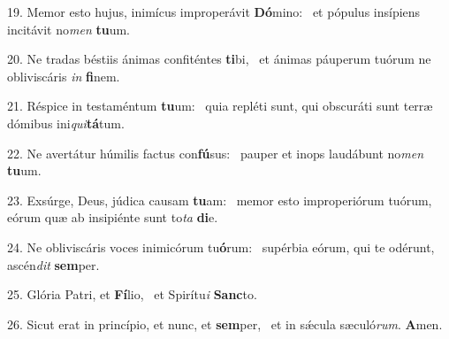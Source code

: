 19. Memor esto hujus, inimícus improperávit \textbf{Dó}mino: \ast\  et pópulus insípiens incitávit no\textit{men} \textbf{tu}um.\

20. Ne tradas béstiis ánimas confiténtes \textbf{ti}bi, \ast\  et ánimas páuperum tuórum ne obliviscáris \textit{in} \textbf{fi}nem.\

21. Réspice in testaméntum \textbf{tu}um: \ast\  quia repléti sunt, qui obscuráti sunt terræ dómibus ini\textit{qui}\textbf{tá}tum.\

22. Ne avertátur húmilis factus con\textbf{fú}sus: \ast\  pauper et inops laudábunt no\textit{men} \textbf{tu}um.\

23. Exsúrge, Deus, júdica causam \textbf{tu}am: \ast\  memor esto improperiórum tuórum, eórum quæ ab insipiénte sunt to\textit{ta} \textbf{di}e.\

24. Ne obliviscáris voces inimicórum tu\textbf{ó}rum: \ast\  supérbia eórum, qui te odérunt, ascén\textit{dit} \textbf{sem}per.\

25. Glória Patri, et \textbf{Fí}lio, \ast\  et Spirítu\textit{i} \textbf{Sanc}to.\

26. Sicut erat in princípio, et nunc, et \textbf{sem}per, \ast\  et in sǽcula sæculó\textit{rum}. \textbf{A}men.\

